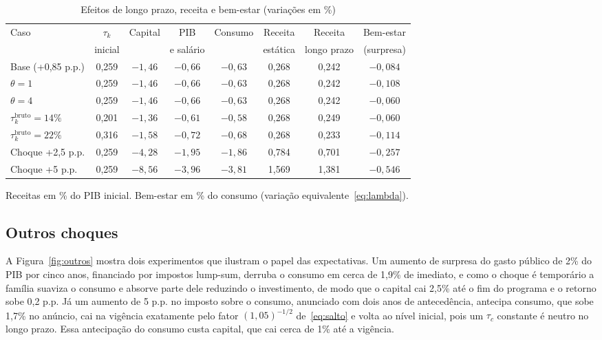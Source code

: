 \documentclass[11pt,a4paper]{article}
\begin{document}
\begin{table}[ht]
\centering
\caption{Efeitos de longo prazo, receita e bem-estar (variações em \%)}
\label{tab:sensibilidade}
\small
\begin{tabular}{lccccccc}
\toprule
Caso & $\tau_k$ & Capital & PIB & Consumo & Receita & Receita & Bem-estar\\
 & inicial & & e salário & & estática & longo prazo & (surpresa)\\
\midrule
Base (+0,85 p.p.) & 0,259 & $-1{,}46$ & $-0{,}66$ & $-0{,}63$ & 0,268 & 0,242 & $-0{,}084$\\
$\theta=1$ & 0,259 & $-1{,}46$ & $-0{,}66$ & $-0{,}63$ & 0,268 & 0,242 & $-0{,}108$\\
$\theta=4$ & 0,259 & $-1{,}46$ & $-0{,}66$ & $-0{,}63$ & 0,268 & 0,242 & $-0{,}060$\\
$\tau_k^{\text{bruto}}=14\%$ & 0,201 & $-1{,}36$ & $-0{,}61$ & $-0{,}58$ & 0,268 & 0,249 & $-0{,}060$\\
$\tau_k^{\text{bruto}}=22\%$ & 0,316 & $-1{,}58$ & $-0{,}72$ & $-0{,}68$ & 0,268 & 0,233 & $-0{,}114$\\
Choque +2,5 p.p. & 0,259 & $-4{,}28$ & $-1{,}95$ & $-1{,}86$ & 0,784 & 0,701 & $-0{,}257$\\
Choque +5 p.p. & 0,259 & $-8{,}56$ & $-3{,}96$ & $-3{,}81$ & 1,569 & 1,381 & $-0{,}546$\\
\bottomrule
\end{tabular}

\smallskip
\footnotesize Receitas em \% do PIB inicial. Bem-estar em \% do consumo
(variação equivalente~\eqref{eq:lambda}).
\end{table}

\subsection{Outros choques}
A Figura~\ref{fig:outros} mostra dois experimentos que ilustram o papel das
expectativas. Um aumento de surpresa do gasto público de 2\% do PIB por cinco
anos, financiado por impostos lump-sum, derruba o consumo em cerca de 1,9\% de
imediato, e como o choque é temporário a família suaviza o consumo e absorve
parte dele reduzindo o investimento, de modo que o capital cai 2,5\% até o fim
do programa e o retorno sobe 0,2 p.p. Já um aumento de 5 p.p. no imposto
sobre o consumo, anunciado com dois anos de antecedência, antecipa consumo,
que sobe 1,7\% no anúncio, cai na vigência exatamente pelo fator
$(1{,}05)^{-1/2}$ de~\eqref{eq:salto} e volta ao nível inicial, pois um
$\tau_c$ constante é neutro no longo prazo. Essa antecipação do consumo custa
capital, que cai cerca de 1\% até a vigência.
\end{document}
